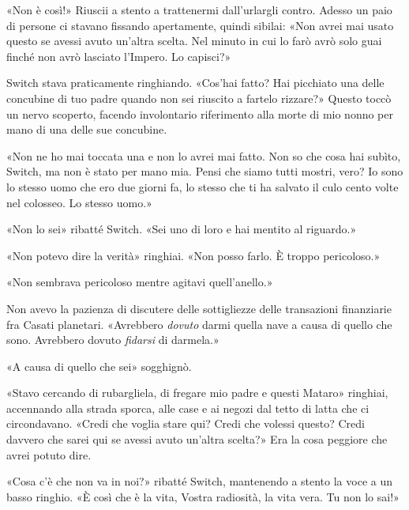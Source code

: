 «Non è così!» Riuscii a stento a trattenermi dall'urlargli contro.
Adesso un paio di persone ci stavano fissando apertamente, quindi
sibilai: «Non avrei mai usato questo se avessi avuto un'altra scelta.
Nel minuto in cui lo farò avrò solo guai finché non avrò lasciato
l'Impero. Lo capisci?»

Switch stava praticamente ringhiando. «Cos'hai fatto? Hai picchiato una
delle concubine di tuo padre quando non sei riuscito a fartelo rizzare?»
Questo toccò un nervo scoperto, facendo involontario riferimento alla
morte di mio nonno per mano di una delle sue concubine.

«Non ne ho mai toccata una e non lo avrei mai fatto. Non so che cosa hai
subìto, Switch, ma non è stato per mano mia. Pensi che siamo tutti
mostri, vero? Io sono lo stesso uomo che ero due giorni fa, lo stesso
che ti ha salvato il culo cento volte nel colosseo. Lo stesso uomo.»

«Non lo sei» ribatté Switch. «Sei uno di loro e hai mentito al
riguardo.»

«Non potevo dire la verità» ringhiai. «Non posso farlo. È troppo
pericoloso.»

«Non sembrava pericoloso mentre agitavi quell'anello.»

Non avevo la pazienza di discutere delle sottigliezze delle transazioni
finanziarie fra Casati planetari. «Avrebbero \emph{dovuto} darmi quella
nave a causa di quello che sono. Avrebbero dovuto \emph{fidarsi} di
darmela.»

«A causa di quello che sei» sogghignò.

«Stavo cercando di rubargliela, di fregare mio padre e questi Mataro»
ringhiai, accennando alla strada sporca, alle case e ai negozi dal tetto
di latta che ci circondavano. «Credi che voglia stare qui? Credi che
volessi questo? Credi davvero che sarei qui se avessi avuto un'altra
scelta?» Era la cosa peggiore che avrei potuto dire.

«Cosa c'è che non va in noi?» ribatté Switch, mantenendo a stento la
voce a un basso ringhio. «È così che è la vita, Vostra radiosità, la
vita vera. Tu non lo sai!»

